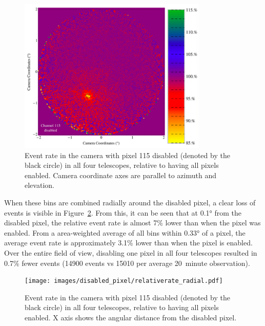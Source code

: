     \begin{figure}[!ht]
      \centering
      \includegraphics[width=0.8\textwidth]{images/disabled_pixel/relativerate_camera}
      \caption[Relative Event Rate After Disabling Camera Pixels]{
        Event rate in the camera with pixel 115 disabled (denoted by the black circle) in all four telescopes, relative to having all pixels enabled.
        Camera coordinate axes are parallel to azimuth and elevation.
      }
      \label{fig:dpix_rel_camera}
    \end{figure}
    
    When these bins are combined radially around the disabled pixel, a clear loss of events is visible in Figure~\ref{fig:dpix_rel_radial}.
    From this, it can be seen that at \ang{0.1} from the disabled pixel, the relative event rate is almost 7\% lower than when the pixel was enabled.
    From a area-weighted average of all bins within \ang{0.33} of a pixel, the average event rate is approximately 3.1\% lower than when the pixel is enabled.
    Over the entire field of view, disabling one pixel in all four telescopes resulted in 0.7\% fewer events (14900 events vs 15010 per average \SI{20}{minute} observation).
    
    \begin{figure}[!ht]
      \centering
      \texttt{[image: images/disabled\_pixel/relativerate\_radial.pdf]}
      \caption[Relative Event Rate After Disabling Camera Pixels]{
        Event rate in the camera with pixel 115 disabled (denoted by the black circle) in all four telescopes, relative to having all pixels enabled.
        X axis shows the angular distance from the disabled pixel.
      }
      \label{fig:dpix_rel_radial}
    \end{figure}

